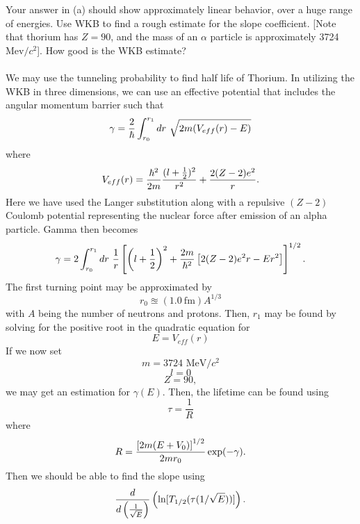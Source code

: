 \documentclass[11pt,letterpaper]{article}
\begin{document}
		\item
		Your answer in (a) should show approximately linear behavior, over a huge range of energies. Use WKB to find a rough estimate for the 
		slope coefficient. [Note that thorium has $Z=90$, and the mass of an $\alpha$ particle is approximately 3724 Mev$/c^2$]. How good
		is the WKB estimate?
		\\
		\\
		We may use the tunneling probability to find half life of Thorium. In utilizing the WKB in three dimensions, we can use an effective 
		potential that includes the angular momentum barrier such that
		\[
			\gamma = \frac{2}{\h}\int_{r_0}^{r_1} dr\ \sqrt{2m(V_{eff}(r)-E)}
		\]
		where
		\[
			V_{eff}(r) = \frac{\h^2}{2m}\frac{(l+\frac{1}{2})^2}{r^2}+\frac{2(Z-2)e^2}{r}.
		\]
		Here we have used the Langer substitution along with a repulsive $(Z-2)$ Coulomb potential representing the nuclear force after
		emission of an alpha particle. Gamma then becomes
		\[
			\gamma = 2\int_{r_0}^{r_1} dr\ \frac{1}{r}\blr{\plr{l+\frac{1}{2}}^2+\frac{2m}{\h^2}\blr{2(Z-2)e^2r-Er^2}}^{1/2}.
		\]
		The first turning point may be approximated by
		\[
			r_0 \approxeq (1.0\  \text{fm})A^{1/3}
		\]
		with $A$ being the number of neutrons and protons. Then, $r_1$ may be found by solving for the positive root in the quadratic 
		equation for
		\[
			E = V_{eff}(r)
		\]
		If we now set 
		\[
			m = \text{3724 MeV}/c^2
		\]
		\[
			l=0
		\]
		\[
			Z = 90,
		\]
		we may get an estimation for $\gamma(E)$. Then, the lifetime can be found using
		\[
				\tau = \frac{1}{R}
		\]
		where
		\[
			R = \frac{\blr{2m(E+V_0)}^{1/2}}{2mr_0}\exp(-\gamma).
		\]
		Then we should be able to find the slope using
		\[
			\diff[]{\pfrac{1}{\sqrt E}}\plr{\ln[T_{1/2}(\tau(1/\sqrt E))]}.
		\]		
	\eenum
\eenum
\end{document}
